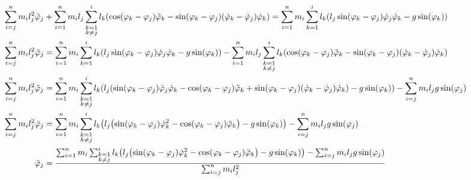 \documentclass{article}
\renewcommand{\phi}{\varphi}
\begin{document}
\begin{align*}
  \sum_{i=j}^n m_i l_j^2 \ddot\phi_j &+ \sum_{i=1}^n m_i l_j \sum_{\substack{k=1\\k \neq j}}^i l_k \pqty{\cos(\phi_k - \phi_j) \ddot\phi_k - \sin(\phi_k - \phi_j)(\dot\phi_k - \dot\phi_j)\dot\phi_k} = \sum_{i=1}^n m_i \sum_{k=1}^i l_k \pqty{l_j \sin(\phi_k - \phi_j) \dot\phi_j \dot\phi_k - g \sin(\phi_k)} \\
  \sum_{i=j}^n m_i l_j^2 \ddot\phi_j &= \sum_{i=1}^n m_i \sum_{k=1}^i l_k \pqty{l_j \sin(\phi_k - \phi_j) \dot\phi_j \dot\phi_k - g \sin(\phi_k)} - \sum_{i=1}^n m_i l_j \sum_{\substack{k=1\\k \neq j}}^i l_k \pqty{\cos(\phi_k - \phi_j) \ddot\phi_k - \sin(\phi_k - \phi_j)(\dot\phi_k - \dot\phi_j)\dot\phi_k} \\
  \sum_{i=j}^n m_i l_j^2 \ddot\phi_j &= \sum_{i=1}^n m_i \sum_{\substack{k=1\\k \neq j}}^i l_k \pqty{l_j \pqty{\sin(\phi_k - \phi_j) \dot\phi_j \dot\phi_k - \cos(\phi_k - \phi_j) \ddot\phi_k + \sin(\phi_k - \phi_j)(\dot\phi_k - \dot\phi_j)\dot\phi_k} - g \sin(\phi_k)} - \sum_{i=j}^n m_i l_j g \sin(\phi_j) \\
  \sum_{i=j}^n m_i l_j^2 \ddot\phi_j &= \sum_{i=1}^n m_i \sum_{\substack{k=1\\k \neq j}}^i l_k \pqty{l_j \pqty{\sin(\phi_k - \phi_j) \dot\phi_k^2 - \cos(\phi_k - \phi_j) \ddot\phi_k} - g \sin(\phi_k)} - \sum_{i=j}^n m_i l_j g \sin(\phi_j) \\
  \ddot\phi_j &= \frac{\sum_{i=1}^n m_i \sum_{\substack{k=1\\k \neq j}}^i l_k \pqty{l_j \pqty{\sin(\phi_k - \phi_j) \dot\phi_k^2 - \cos(\phi_k - \phi_j) \ddot\phi_k} - g \sin(\phi_k)} - \sum_{i=j}^n m_i l_j g \sin(\phi_j)}{\sum_{i=j}^n m_i l_j^2} \\
\end{align*}
\end{document}
